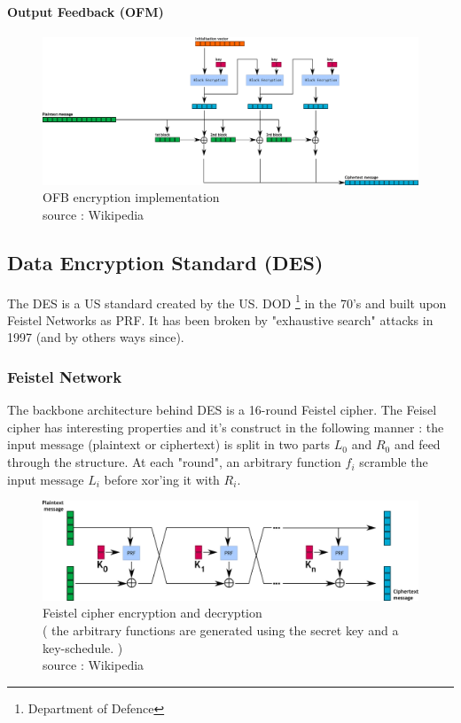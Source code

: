 \paragraph{ Output Feedback (OFM) }

\begin{figure}[h!]
    \centering
       \includegraphics[width=\textwidth]{images/OFB.png}
	\caption{OFB encryption implementation \\ source : Wikipedia}
	\label{fig:OFB_encryption_impl}
\end{figure}


\subsection{Data Encryption Standard (DES)}

The DES is a US standard created by the US. DOD \footnote{Department of Defence} in the 70's and built upon Feistel Networks as PRF. It has been broken by "exhaustive search" attacks in 1997 (and by others ways since).

\subsubsection{Feistel Network}

The backbone architecture behind DES is a 16-round Feistel cipher. The Feisel cipher has interesting properties and it's construct in the following manner : the input message (plaintext or ciphertext) is split in two parts $L_0$ and $R_0$ and feed through the structure. At each "round", an arbitrary function $f_i$ scramble the input message $L_i$ before xor'ing it with $R_i$.

\begin{figure}[ht!]
    \centering
       \includegraphics[width=\textwidth]{images/Feistel_encryption.png}
    \caption{Feistel cipher encryption and decryption \\ ( the arbitrary functions are generated using the secret key and a key-schedule. )\\ source : Wikipedia}
	\label{fig:Feistel_cipher}
\end{figure}
 

